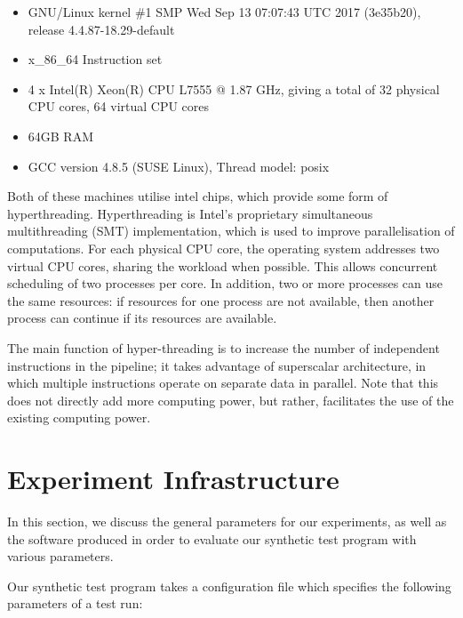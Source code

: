 \begin{itemize}
    \item GNU/Linux kernel \#1 SMP Wed Sep 13 07:07:43 UTC 2017 (3e35b20), release 4.4.87-18.29-default
    \item x\_86\_64 Instruction set
    \item 4 x Intel(R) Xeon(R) CPU L7555 @ 1.87 GHz, giving a total of 32 physical CPU cores, 64 virtual CPU cores
    \item 64GB RAM
    \item GCC version 4.8.5 (SUSE Linux), Thread model: posix
\end{itemize}

Both of these machines utilise intel chips, which provide some form of hyperthreading. Hyperthreading is Intel's proprietary simultaneous multithreading (SMT) implementation, which is used to improve parallelisation of computations. For each physical CPU core, the operating system addresses two virtual CPU cores, sharing the workload when possible. This allows concurrent scheduling of two processes per core. In addition, two or more processes can use the same resources: if resources for one process are not available, then another process can continue if its resources are available. 

The main function of hyper-threading is to increase the number of independent instructions in the pipeline; it takes advantage of superscalar architecture, in which multiple instructions operate on separate data in parallel. Note that this does not directly add more computing power, but rather, facilitates the use of the existing computing power.



\section{Experiment Infrastructure}
\label{section:experimental_methodology:experiment_infrastructure}

In this section, we discuss the general parameters for our experiments, as well as the software produced in order to evaluate our synthetic test program with various parameters.

Our synthetic test program takes a configuration file which specifies the following parameters of a test run:

